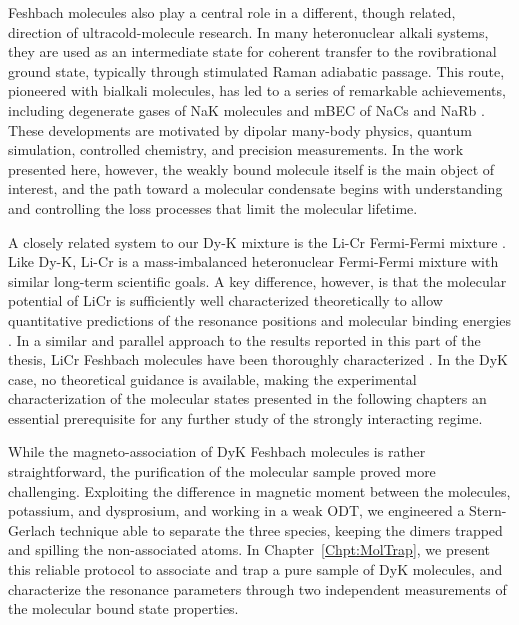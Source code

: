 Feshbach molecules also play a central role in a different, though related, direction of ultracold-molecule research. In many heteronuclear alkali systems, they are used as an intermediate state for coherent transfer to the rovibrational ground state, typically through stimulated Raman adiabatic passage. This route, pioneered with bialkali molecules, has led to a series of remarkable achievements, including degenerate gases of NaK molecules \cite{Schindewolf2022eom} and \ac{mBEC} of NaCs \cite{Bigagli2024oob} and NaRb \cite{Shi2025bec}. These developments are motivated by dipolar many-body physics, quantum simulation, controlled chemistry, and precision measurements. In the work presented here, however, the weakly bound molecule itself is the main object of interest, and the path toward a molecular condensate begins with understanding and controlling the loss processes that limit the molecular lifetime.


A closely related system to our Dy-K mixture is the Li-Cr Fermi-Fermi mixture \cite{Ciamei2022ddf}. Like Dy-K, Li-Cr is a mass-imbalanced heteronuclear Fermi-Fermi mixture with similar long-term scientific goals. A key difference, however, is that the molecular potential of LiCr is sufficiently well characterized theoretically to allow quantitative predictions of the resonance positions and molecular binding energies \cite{Ciamei2022euc}. In a similar and parallel approach to the results reported in this part of the thesis, LiCr Feshbach molecules have been thoroughly characterized \cite{Finelli2024ula}. In the DyK case, no theoretical guidance is available, making the experimental characterization of the molecular states presented in the following chapters an essential prerequisite for any further study of the strongly interacting regime.

While the magneto-association of DyK Feshbach molecules is rather straightforward, the purification of the molecular sample proved more challenging. Exploiting the difference in magnetic moment between the molecules, potassium, and dysprosium, and working in  a weak \ac{ODT}, we engineered a Stern-Gerlach technique able to separate the three species, keeping the dimers trapped and spilling the non-associated atoms. In Chapter~\ref{Chpt:MolTrap}, we present this reliable protocol to associate and trap a pure sample of DyK molecules, and characterize the resonance parameters through two independent measurements of the molecular bound state properties.

